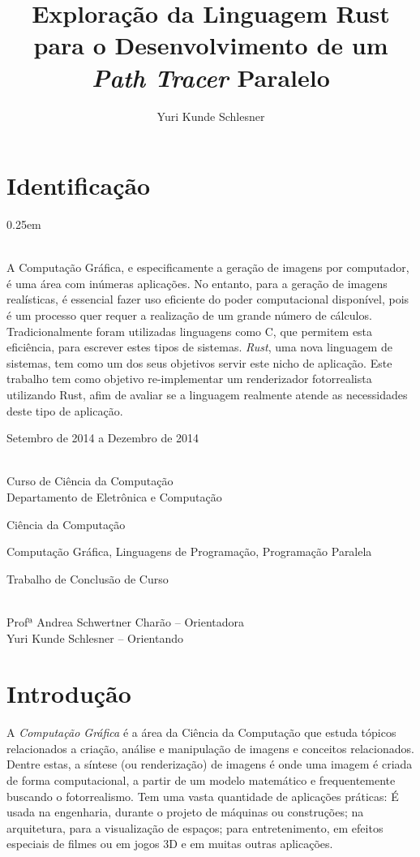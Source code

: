 \documentclass[12pt]{article}
\title{Exploração da Linguagem Rust para o Desenvolvimento de um \emph{Path Tracer} Paralelo}
\author{Yuri Kunde Schlesner}
\def\Cpp{{C\nolinebreak[4]\raisebox{.20ex}{\small\bf++}}}
\begin{document}
\maketitle

\section{Identificação}

\begin{description} \itemsep 0.25em
	\item[Resumo:] ~\\
		A Computação Gráfica, e especificamente a geração de imagens por computador, é uma área com
		inúmeras aplicações. No entanto, para a geração de imagens realísticas, é essencial fazer
		uso eficiente do poder computacional disponível, pois é um processo quer requer a realização
		de um grande número de cálculos. Tradicionalmente foram utilizadas linguagens como \Cpp, que
		permitem esta eficiência, para escrever estes tipos de sistemas. \emph{Rust}, uma nova
		linguagem de sistemas, tem como um dos seus objetivos servir este nicho de aplicação. Este
		trabalho tem como objetivo re-implementar um renderizador fotorrealista utilizando Rust,
		afim de avaliar se a linguagem realmente atende as necessidades deste tipo de aplicação.
	\item[Período de execução:] Setembro de 2014 a Dezembro de 2014
	\item[Unidades participantes:] ~\\ Curso de Ciência da Computação \\ Departamento de Eletrônica e Computação
	\item[Área de conhecimento:] Ciência da Computação
	\item[Linha de Pesquisa:] Computação Gráfica, Linguagens de Programação, Programação Paralela
	\item[Tipo de projeto:] Trabalho de Conclusão de Curso
	\item[Participantes:] ~\\ Profª Andrea Schwertner Charão -- Orientadora \\ Yuri Kunde Schlesner -- Orientando
\end{description}

\section{Introdução}

A \emph{Computação Gráfica} é a área da Ciência da Computação que estuda tópicos relacionados a
criação, análise e manipulação de imagens e conceitos relacionados. Dentre estas, a síntese (ou
renderização) de imagens é onde uma imagem é criada de forma computacional, a partir de um modelo
matemático e frequentemente buscando o fotorrealismo. Tem uma vasta quantidade de aplicações
práticas: É usada na engenharia, durante o projeto de máquinas ou construções; na arquitetura, para
a visualização de espaços; para entretenimento, em efeitos especiais de filmes ou em jogos 3D e em
muitas outras aplicações.
\end{document}
